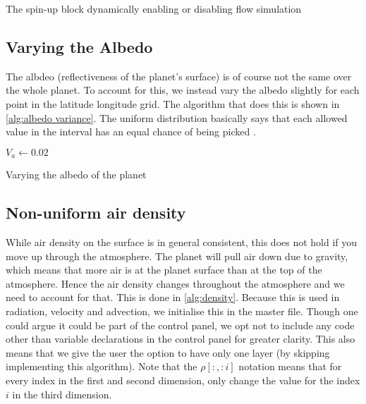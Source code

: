 \begin{algorithm}
    \caption{The spin-up block dynamically enabling or disabling flow simulation}
    \label{alg:spinup}
\end{algorithm}

\subsection{Varying the Albedo}
The albdeo (reflectiveness of the planet's surface) is of course not the same over the whole planet. To account for this, we instead vary the albedo slightly for each point in the latitude 
longitude grid. The algorithm that does this is shown in \autoref{alg:albedo variance}. The uniform distribution basically says that each allowed value in the interval has an equal chance of 
being picked \cite{uniformdist}.

\begin{algorithm}
    $V_a \leftarrow 0.02$ \;
    \caption{Varying the albedo of the planet}
    \label{alg:albedo variance}
\end{algorithm}

\subsection{Non-uniform air density}
While air density on the surface is in general consistent, this does not hold if you move up through the atmosphere. The planet will pull air down due to gravity, which means that more air is at 
the planet surface than at the top of the atmosphere. Hence the air density changes throughout the atmosphere and we need to account for that. This is done in \autoref{alg:density}. Because this 
is used in radiation, velocity and advection, we initialise this in the master file. Though one could argue it could be part of the control panel, we opt not to include any code other than 
variable declarations in the control panel for greater clarity. This also means that we give the user the option to have only one layer (by skipping implementing this algorithm). Note that the 
$\rho[:,: i]$ notation means that for every index in the first and second dimension, only change the value for the index $i$ in the third dimension.

